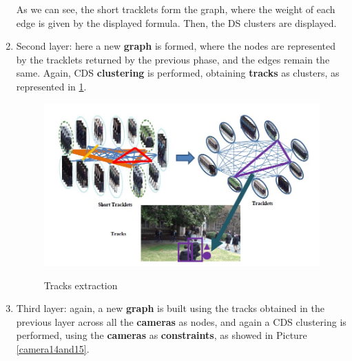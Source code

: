 \begin{enumerate}
    As we can see, the short tracklets form the graph, where the weight of each edge is given by the displayed formula. Then, the DS clusters are displayed.

    \item Second layer: here a new \textbf{graph} is formed, where the nodes are represented by the tracklets returned by the previous phase, and the edges remain the same. Again, CDS \textbf{clustering} is performed, obtaining \textbf{tracks} as clusters, as represented in \ref{camera8}.

    \begin{figure}[h!]
        \centering
        \includegraphics[scale = 1.4]{img/camera8.jpg}
        \label{camera8}
        \caption{Tracks extraction}
    \end{figure}

    \item Third layer: again, a new \textbf{graph} is built using the tracks obtained in the previous layer across all the \textbf{cameras} as nodes, and again a CDS clustering is performed, using the \textbf{cameras} as \textbf{constraints}, as showed in Picture \ref{camera14and15}. 


\end{enumerate}
